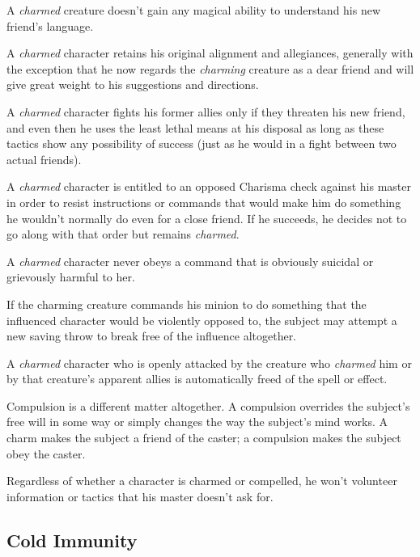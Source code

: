 \begin{itemize*}
\item A \textit{charmed} creature doesn't gain any magical ability to understand his new friend's language.
\item A \textit{charmed} character retains his original alignment and allegiances, generally with the exception that he now regards the \textit{charming} creature as a dear friend and will give great weight to his suggestions and directions.
\item A \textit{charmed} character fights his former allies only if they threaten his new friend, and even then he uses the least lethal means at his disposal as long as these tactics show any possibility of success (just as he would in a fight between two actual friends).
\item A \textit{charmed} character is entitled to an opposed Charisma check against his master in order to resist instructions or commands that would make him do something he wouldn't normally do even for a close friend. If he succeeds, he decides not to go along with that order but remains \textit{charmed}.
\item A \textit{charmed} character never obeys a command that is obviously suicidal or grievously harmful to her.
\item If the charming creature commands his minion to do something that the influenced character would be violently opposed to, the subject may attempt a new saving throw to break free of the influence altogether.
\item A \textit{charmed} character who is openly attacked by the creature who \textit{charmed} him or by that creature's apparent allies is automatically freed of the spell or effect.
\end{itemize*}

Compulsion is a different matter altogether. A compulsion overrides the subject's 
free will in some way or simply changes the way the subject's mind works. A charm 
makes the subject a friend of the caster; a compulsion makes the subject obey the 
caster.

Regardless of whether a character is charmed or compelled, he won't volunteer information 
or tactics that his master doesn't ask for.

\subsection{Cold Immunity}

